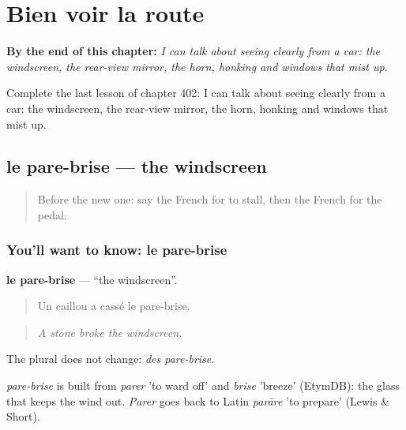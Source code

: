 
\chapter{Bien voir la route}
\label{ch:fr-bien-voir-la-route}

\begin{chapteropening}
\textbf{By the end of this chapter:} \emph{I can talk about seeing clearly from a car: the windscreen, the rear-view mirror, the horn, honking and windows that mist up.}

Complete the last lesson of chapter 402: I can talk about seeing clearly from a car: the windscreen, the rear-view mirror, the horn, honking and windows that mist up.
\end{chapteropening}

\section[le pare-brise]{le pare-brise — the windscreen}

\label{lesson:FR-C402-pare-brise}



\begin{quote}
Before the new one: say the French for to stall, then the French for the pedal.
\end{quote}

\subsection*{You'll want to know: le pare-brise}
\textbf{le pare-brise} — \textquotedblleft{}the windscreen\textquotedblright{}.

\begin{quote}
Un caillou a cassé le pare-brise.
\end{quote}

\begin{quote}
\emph{A stone broke the windscreen.}
\end{quote}

The plural does not change: \emph{des pare-brise}.

\begin{cousinweb}
\emph{pare-brise} is built from \emph{parer} 'to ward off' and \emph{brise} 'breeze' (EtymDB): the glass that keeps the wind out. \emph{Parer} goes back to Latin \emph{parāre} 'to prepare' (Lewis \& Short).
\end{cousinweb}

